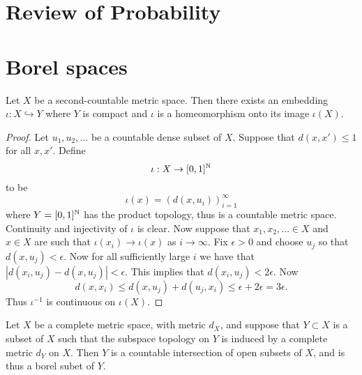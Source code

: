 \documentclass[twoside, a4paper, 10pt]{amsart}
\begin{document}
\appendix

\section{Review of Probability}

\section{Borel spaces}

\begin{lemma} Let $X$ be a second-countable metric space. Then there exists an embedding $\iota:X \hookrightarrow Y$ where $Y$ is compact and $\iota$ is a homeomorphism onto its image $\iota(X)$.

\end{lemma}

\begin{proof} Let $u_1,u_2,\ldots $ be a countable dense subset of $X$. Suppose that $d(x,x')\leq 1$ for all $x,x'$. Define $$\iota:X \to [0,1]^{\mathbb{N}}$$ to be $$\iota(x) = (d(x,u_i))_{i=1}^{\infty}$$ where $Y=[0,1]^{\mathbb{N}}$ has the product topology, thus is a countable metric space. Continuity and injectivity of $\iota$ is clear. Now suppose that $x_1,x_2,\ldots \in X$ and $x\in X$ are such that $\iota(x_i) \to \iota(x)$ as $i \to \infty$. Fix $\epsilon>0$ and choose $u_j$ so that $d(x,u_j)<\epsilon$. Now for all sufficiently large $i$ we have that $|d(x_i, u_j) - d(x,u_j)| < \epsilon$. This implies that $d(x_i,u_j) < 2\epsilon$. Now $$d(x,x_i) \leq d(x,u_j) + d(u_j,x_i) \leq \epsilon + 2\epsilon  = 3\epsilon.$$ Thus $\iota^{-1}$ is continuous on $\iota(X)$. \end{proof}

\begin{lemma} Let $X$ be a complete metric space, with metric $d_X$, and suppose that $Y \subset X$ is a subset of $X$ such that the subspace topology on $Y$ is induced by a complete metric $d_Y$ on $X$. Then $Y$ is a countable intersection of open subsets of $X$, and is thus a borel subet of $Y$.

\end{lemma}
\end{document}
